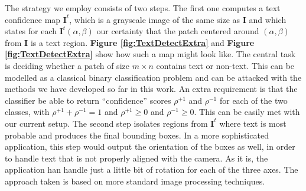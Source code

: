\documentclass[12pt,a4paper,oneside,english]{UPBThesis}
\newcommand{\hctimes}[2]{{#1}\!\times\!{#2}}
\begin{document}
The strategy we employ consists of two steps. The first one computes a text confidence map $\textbf{I}^t$, which is a grayscale image of the same size as $\textbf{I}$ and which states for each $\textbf{I}^t(\alpha,\beta)$ our certainty that the patch centered around $(\alpha,\beta)$ from $\textbf{I}$ is a text region. \textbf{Figure \ref{fig:TextDetectExtra}} and \textbf{Figure \ref{fig:TextDetectExtra}} show how such a map might look like. The central task is deciding whether a patch of size $\hctimes{m}{n}$ contains text or non-text. This can be modelled as a classical binary classification problem and can be attacked with the methods we have developed so far in this work. An extra requirement is that the classifier be able to return ``confidence'' scores $\rho^{+1}$ and $\rho^{-1}$ for each of the two classes, with $\rho^{+1} + \rho^{-1} = 1$ and $\rho^{+1} \geq 0$ and $\rho^{-1} \geq 0$. This can be easily met with our current setup. The second step isolates regions from $\textbf{I}^t$ where text is most probable and produces the final bounding boxes. In a more sophisticated application, this step would output the orientation of the boxes as well, in order to handle text that is not properly aligned with the camera. As it is, the application han handle just a little bit of rotation for each of the three axes. The approach taken is based on more standard image processing techniques.
\end{document}
